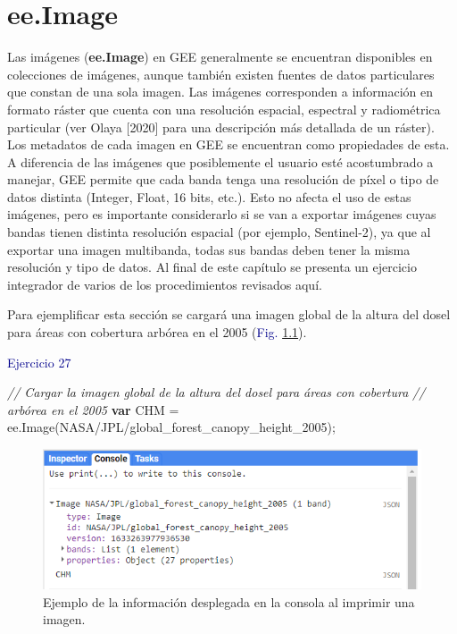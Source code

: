 \documentclass[
  12pt,
  letterpaper,
  twoside]{book}
\newenvironment{Shaded}{\begin{snugshade}}{\end{snugshade}}
\newcommand{\CommentTok}[1]{\textcolor[rgb]{0.24,0.58,0.00}{\textit{#1}}}
\newcommand{\FunctionTok}[1]{\textcolor[rgb]{0.48,0.12,0.64}{#1}}
\newcommand{\KeywordTok}[1]{\textcolor[rgb]{0.00,0.00,0.00}{\textbf{#1}}}
\newcommand{\NormalTok}[1]{#1}
\newcommand{\OperatorTok}[1]{\textcolor[rgb]{0.00,0.00,0.00}{#1}}
\newcommand{\StringTok}[1]{\textcolor[rgb]{0.87,0.29,0.22}{#1}}
\newcommand\boldpurple[1]{\textcolor{darkpurple}{\textbf{#1}}}
\begin{document}
\newpage

\hypertarget{ee.image-1}{%
\chapter{ee.Image}\label{ee.image-1}}

Las imágenes (\boldpurple{ee.Image}) en GEE generalmente se encuentran disponibles en colecciones de imágenes, aunque también existen fuentes de datos particulares que constan de una sola imagen. Las imágenes corresponden a información en formato ráster que cuenta con una resolución espacial, espectral y radiométrica particular (ver Olaya {[}2020{]} para una descripción más detallada de un ráster).
Los metadatos de cada imagen en GEE se encuentran como propiedades de esta. A diferencia de las imágenes que posiblemente el usuario esté acostumbrado a manejar, GEE permite que cada banda tenga una resolución de píxel o tipo de datos distinta (Integer, Float, 16 bits, etc.). Esto no afecta el uso de estas imágenes, pero es importante considerarlo si se van a exportar imágenes cuyas bandas tienen distinta resolución espacial (por ejemplo, Sentinel-2), ya que al exportar una imagen multibanda, todas sus bandas deben tener la misma resolución y tipo de datos. Al final de este capítulo se presenta un ejercicio integrador de varios de los procedimientos revisados aquí.

Para ejemplificar esta sección se cargará una imagen global de la altura del dosel para áreas con cobertura arbórea en el 2005 (\textcolor{darkblue}{Fig.} \ref{fig:f91}).

\textcolor{darkblue}{Ejercicio 27}

\begin{Shaded}
\begin{Highlighting}[]
\CommentTok{// Cargar la imagen global de la altura del dosel para áreas con cobertura }
\CommentTok{// arbórea en el 2005}
\KeywordTok{var}\NormalTok{ CHM }\OperatorTok{=}\NormalTok{ ee}\OperatorTok{.}\FunctionTok{Image}\NormalTok{(}\StringTok{\textquotesingle{}NASA/JPL/global\_forest\_canopy\_height\_2005\textquotesingle{}}\NormalTok{)}\OperatorTok{;}
\end{Highlighting}
\end{Shaded}

\begin{figure}[H]

{\centering \includegraphics[width=0.95\linewidth]{Img/ej271} 

}

\caption{Ejemplo de la  información desplegada en la consola al imprimir una imagen.}\label{fig:f91}
\end{figure}
\end{document}
